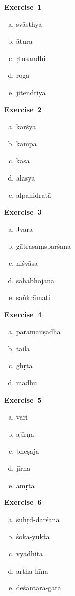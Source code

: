 \begin{multicols}{2}
\noindent\textbf{Exercise~1}
\begin{enumerate}[a.]
\itemsep=0pt
\item svāsthya 
\item ātura 
\item ṛtusandhi 
\item roga 
\item jitendriya
\end{enumerate}

\noindent\textbf{Exercise~2}
\begin{enumerate}[a.]
\itemsep=0pt
\item kārśya 
\item kampa
\item kāsa
\item ālasya
\item alpanidratā
\end{enumerate}

\noindent\textbf{Exercise~3}
\begin{enumerate}[a.]
\itemsep=0pt
\item Jvara
\item gātrasaṃsparśana 
\item niśvāsa
\item sahabhojana 
\item saṅkrāmati
\end{enumerate}
\vspace{.3cm}

\noindent\textbf{Exercise~4}
\begin{enumerate}[a.]
\itemsep=0pt
\item paramauṣadha 
\item taila
\item ghṛta 
\item madhu 
\end{enumerate}

\noindent\textbf{Exercise~5}
\begin{enumerate}[a.]
\itemsep=0pt
\item vāri 
\item ajīrṇa 
\item bheṣaja 
\item jīrṇa 
\item amṛta
\end{enumerate}

\noindent\textbf{Exercise~6}
\begin{enumerate}[a.]
\itemsep=0pt
\item suhṛd-darśana 
\item śoka-yukta 
\item vyādhita 
\item artha-hīna 
\item deśāntara-gata
\end{enumerate}


\end{multicols}
